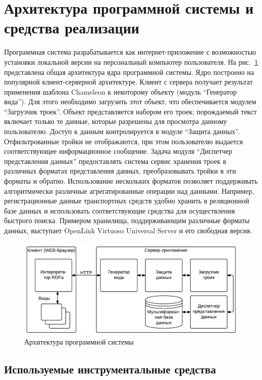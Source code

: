 \documentclass[utf8]{../IncArticle}
\begin{document}
\section{Архитектура программной системы и средства реализации}

Программная система разрабатывается как интернет-приложение с
возможностью установки локальной версии на персональный компьютер
пользователя.  На рис.~\ref{architecture} представлена общая
архитектура ядра программной системы.  Ядро построено на популярной
клиент-серверной архитектуре.  Клиент с сервера получает результат
применения шаблона Chameleon к некоторому объекту (модуль ``Генератор
вида'').  Для этого необходимо загрузить этот объект, что
обеспечивается модулем ``Загрузчик троек''.  Объект представляется
набором его троек; порождаемый текст включает только те данные,
которые разрешены для просмотра данному пользователю.  Доступ к данным
контролируется в модуле ``Защита данных''.  Отфильтрованные тройки не
отображаются, при этом пользователю выдается соответствующее
информационное сообщение.  Задача модуля ``Диспетчер представления
данных'' предоставлять система сервис хранения троек в различных
форматах представления данных, преобразовывать тройки в эти форматы и
обратно.  Использование нескольких форматов позволяет поддерживать
алгоритмически различные агрегатированные операции над данными.
Например, регистрационные данные транспортных средств удобно хранить в
реляционной базе данных и использовать соответствующие средства для
осуществления быстрого поиска.  Примером хранилища, поддерживающим
различные форматы данных, выступает OpenLink Virtuoso Universal Server
\cite{b2:8} и его свободная версия.

\begin{figure}[!t]
\centering
\includegraphics[width=0.8\linewidth]{peixe-architecture-ru-1.pdf}
\caption{Архитектура программной системы}
\label{architecture}
\end{figure}

\subsection{Используемые инструментальные средства}
\label{sec:instr}
\end{document}
